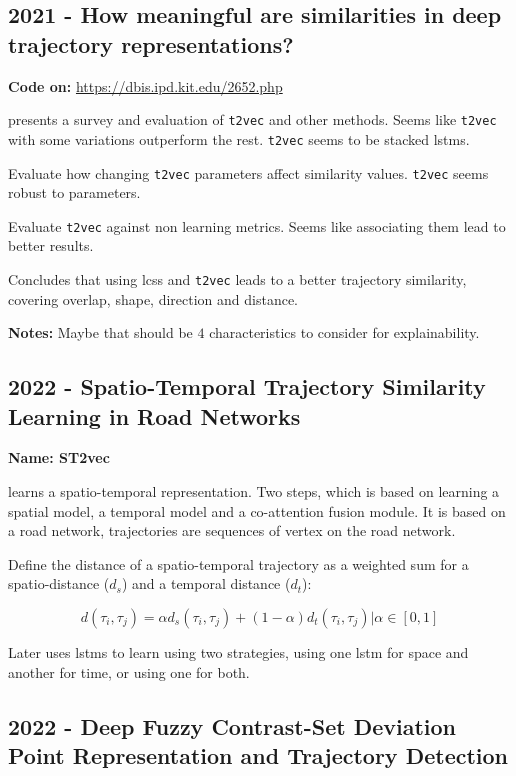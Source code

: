 \subsection*{2021 - How meaningful are similarities in deep trajectory representations?}

\textbf{Code on:} \url{https://dbis.ipd.kit.edu/2652.php}

\cite{taghizadeh2021meaningful} presents a survey and evaluation of \texttt{t2vec} \cite{li2018deep} and other methods. Seems like \texttt{t2vec} with some variations outperform the rest. \texttt{t2vec} seems to be stacked \glspl{lstm}.

Evaluate how changing \texttt{t2vec} parameters affect similarity values. \texttt{t2vec} seems robust to parameters.

Evaluate \texttt{t2vec} against non learning metrics. Seems like associating them lead to better results.


Concludes that using \gls{lcss} and \texttt{t2vec} leads to a better trajectory similarity, covering overlap, shape, direction and distance.

\textbf{Notes:} Maybe that should be $4$ characteristics to consider for explainability.   


\subsection*{2022 - Spatio-Temporal Trajectory Similarity Learning in Road Networks}

\textbf{Name: ST2vec}

\cite{fang2022spatio} learns a spatio-temporal representation. Two steps, which is based on learning a spatial model, a temporal model and a co-attention fusion module. It is based on a road network, trajectories are sequences of vertex on the road network.

Define the distance of a spatio-temporal trajectory as a weighted sum for a spatio-distance ($d_s$) and a temporal distance ($d_t$):

$$d(\tau_i, \tau_j) = \alpha d_s(\tau_i, \tau_j) + (1-\alpha)d_t(\tau_i, \tau_j) | \alpha \in [0,1]$$

Later uses \glspl{lstm} to learn using two strategies, using one \gls{lstm} for space and another for time, or using one for both.

\subsection*{2022 - Deep Fuzzy Contrast-Set Deviation Point Representation and Trajectory Detection}


